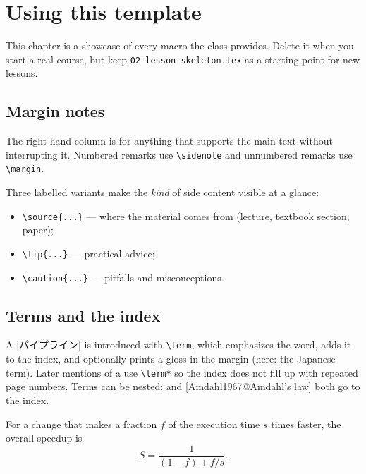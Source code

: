 \documentclass[../main.tex]{subfiles}
\begin{document}
\chapter{Using this template}

This chapter is a showcase of every macro the class provides.  Delete it
when you start a real course, but keep \texttt{02-lesson-skeleton.tex} as a
starting point for new lessons.

\section{Margin notes}

The right-hand column is for anything that supports the main text without
interrupting it.  Numbered remarks use \verb|\sidenote| and unnumbered remarks use
\verb|\margin|.

Three labelled variants make the \emph{kind} of side content visible at a
glance:
\begin{itemize}
  \item \verb|\source{...}| --- where the material comes from (lecture, textbook section, paper);
  \item \verb|\tip{...}| --- practical advice;
  \item \verb|\caution{...}| --- pitfalls and misconceptions.
\end{itemize}

\section{Terms and the index}

A [パイプライン] is introduced with \verb|\term|, which
emphasizes the word, adds it to the index, and optionally prints a gloss in
the margin (here: the Japanese term).  Later mentions of a
 use \verb|\term*| so the index does not fill up with
repeated page numbers.  Terms can be nested:  and
[Amdahl1967@Amdahl's law] both go to the index.

\begin{definition}[Speedup]
  For a change that makes a fraction $f$ of the execution time $s$ times
  faster, the overall speedup is
  \begin{equation}
    S = \frac{1}{(1-f) + f/s}.
    \label{eq:amdahl}
  \end{equation}
\end{definition}
\end{document}
